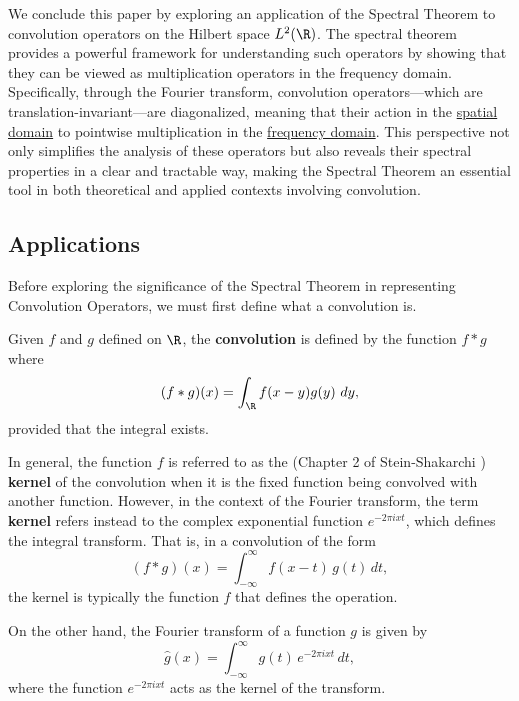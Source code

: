 We conclude this paper by exploring an application of the Spectral Theorem to convolution operators on the Hilbert space \( L^{2}(\R) \). The spectral theorem provides a powerful framework for understanding such operators by showing that they can be viewed as multiplication operators in the frequency domain. Specifically, through the Fourier transform, convolution operators—which are translation-invariant—are diagonalized, meaning that their action in the {\hyperref[Spatial Domain]{spatial domain}} to pointwise multiplication in the {\hyperref[Frequency Domain]{frequency domain}}. This perspective not only simplifies the analysis of these operators but also reveals their spectral properties in a clear and tractable way, making the Spectral Theorem an essential tool in both theoretical and applied contexts involving convolution.


\subsection{Applications}

Before exploring the significance of the Spectral Theorem in representing Convolution Operators, we must first define what a convolution is.

\begin{definition}
    Given \( f \) and \( g  \) defined on \( \R  \), the \textbf{convolution} is defined by the function \( f * g   \) where
    \[  (f * g) (x) = \int_{\R} f(x-y) g(y)   \ dy, \]
    provided that the integral exists.
\end{definition}

In general, the function \( f \) is referred to as the (Chapter 2 of Stein-Shakarchi \cite{Stein}) \textbf{kernel} of the convolution when it is the fixed function being convolved with another function. However, in the context of the Fourier transform, the term \textbf{kernel} refers instead to the complex exponential function \( e^{-2\pi i x t} \), which defines the integral transform. That is, in a convolution of the form
\[
(f * g)(x) = \int_{-\infty}^{\infty} f(x - t)\, g(t)\, dt,
\]
the kernel is typically the function \( f \) that defines the operation.

\medskip

On the other hand, the Fourier transform of a function \( g \) is given by
\[
\hat{g}(x) = \int_{-\infty}^{\infty} g(t)\, e^{-2\pi i x t}\, dt,
\]
where the function \( e^{-2\pi i x t} \) acts as the kernel of the transform.

